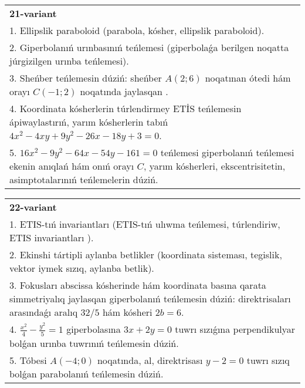 \documentclass{article}
\begin{document}
\begin{tabular}{m{17cm}}
\textbf{21-variant}\\
1. Ellipslik paraboloid (parabola, kósher, ellipslik paraboloid).\\

2. Giperbolanıń urınbasınıń teńlemesi (giperbolaǵa berilgen noqatta júrgizilgen urınba teńlemesi).\\

3. Sheńber teńlemesin dúziń: sheńber $A (2;6 ) $ noqatınan ótedi hám orayı $C (-1;2) $ noqatında jaylasqan .\\

4. Koordinata kósherlerin túrlendirmey ETİS teńlemesin ápiwaylastırıń, yarım kósherlerin tabıń $4x^{2} - 4xy + 9y^{2} - 26x - 18y + 3 = 0$.\\

5. $16x^{2} - 9y^{2} - 64x - 54y - 161 = 0$ teńlemesi giperbolanıń teńlemesi ekenin anıqlań hám onıń orayı $C$, yarım kósherleri, ekscentrisitetin, asimptotalarınıń teńlemelerin dúziń.  
\end{tabular}
\vspace{1cm}


\begin{tabular}{m{17cm}}
\textbf{22-variant}\\
1. ETIS-tıń invariantları (ETIS-tıń ulıwma teńlemesi, túrlendiriw, ETIS invariantları ).\\

2. Ekinshi tártipli aylanba betlikler (koordinata sisteması, tegislik, vektor iymek sızıq, aylanba betlik).\\

3. Fokusları abscissa kósherinde hám koordinata basına qarata simmetriyalıq jaylasqan giperbolanıń teńlemesin dúziń: direktrisaları arasındaǵı aralıq $32/5$ hám kósheri $2 b=6$.\\

4. $\frac{x^{2}}{4} - \frac{y^{2}}{5} = 1$ giperbolasına $3x + 2y = 0$ tuwrı sızıǵına perpendikulyar bolǵan urınba tuwrınıń teńlemesin dúziń.\\

5. Tóbesi $A(-4;0)$ noqatında, al, direktrisası $y - 2 = 0$ tuwrı sızıq bolǵan parabolanıń teńlemesin dúziń.
\end{tabular}
\vspace{1cm}
\end{document}
